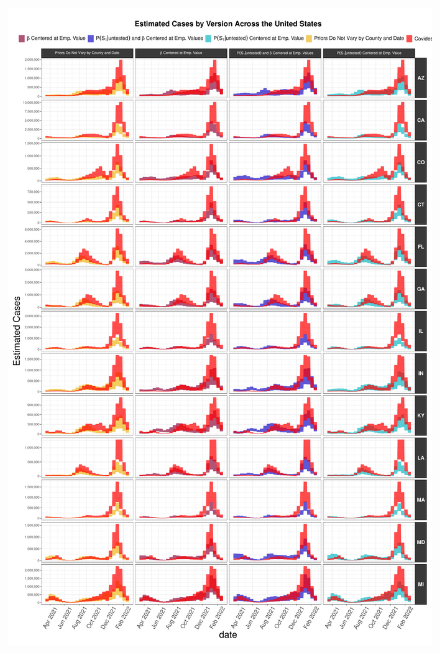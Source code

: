 \documentclass[12pt,twoside]{smiththesis}
\begin{document}
\begin{figure}
\includegraphics[width=1\linewidth]{figure/state_comp_covidestim1} \caption{\label{fig:state-results-1}}\label{fig:unnamed-chunk-80}
\end{figure}
\end{document}

